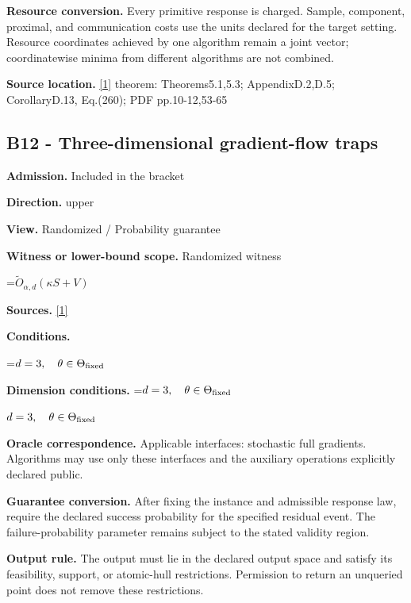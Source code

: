 \documentclass[10pt,a4paper]{article}
\newcommand{\AtlasMath}[1]{\par\begingroup\centering\setbox0=\hbox{$\displaystyle #1$}\ifdim\wd0>1.4\linewidth\typeout{ATLAS WIDE FORMULA: \the\wd0}\fi\ifdim\wd0>\linewidth\resizebox{\linewidth}{!}{\box0}\else\box0\fi\par\endgroup}
\newcommand{\AtlasInlineMath}[1]{\begingroup\setbox0=\hbox{$#1$}\ifdim\wd0>.4\linewidth\endgroup\AtlasMath{#1}\else\endgroup$#1$\fi}
\begin{document}
\textbf{Resource conversion.} Every primitive response is charged. Sample, component, proximal, and communication costs use the units declared for the target setting. Resource coordinates achieved by one algorithm remain a joint vector; coordinatewise minima from different algorithms are not combined.



\textbf{Source location.} \href{https://arxiv.org/pdf/2609.03990}{[1]} theorem: Theorems5.1,5.3; AppendixD.2,D.5; CorollaryD.13, Eq.(260); PDF pp.10-12,53-65



\subsection{B12 - Three-dimensional gradient-flow traps}


\textbf{Admission.} Included in the bracket



\textbf{Direction.} upper



\textbf{View.} Randomized / Probability guarantee



\textbf{Witness or lower-bound scope.} Randomized witness



\AtlasMath{\widetilde{O}_{\alpha,d}(\kappa S+V)}


\textbf{Sources.} \href{https://arxiv.org/pdf/2609.03990}{[1]}



\textbf{Conditions.}
\AtlasMath{d=3,\quad\theta\in\Theta_{\rm fixed}}




\textbf{Dimension conditions.} \AtlasInlineMath{d=3,\quad\theta\in\Theta_{\rm fixed}}



\textbf{Oracle correspondence.} Applicable interfaces: stochastic full gradients. Algorithms may use only these interfaces and the auxiliary operations explicitly declared public.



\textbf{Guarantee conversion.} After fixing the instance and admissible response law, require the declared success probability for the specified residual event. The failure-probability parameter remains subject to the stated validity region.



\textbf{Output rule.} The output must lie in the declared output space and satisfy its feasibility, support, or atomic-hull restrictions. Permission to return an unqueried point does not remove these restrictions.
\end{document}
